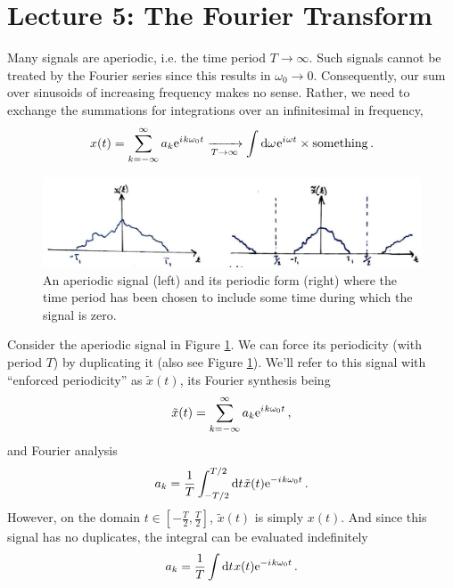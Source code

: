 \section{Lecture 5: The Fourier Transform}

Many signals are aperiodic, i.e. the time period $T \rightarrow\infty$. Such
signals cannot be treated by the Fourier series since this results in
$\omega_0\rightarrow 0$. Consequently, our sum over sinusoids of increasing
frequency makes no sense. Rather, we need to exchange the summations for
integrations over an infinitesimal in frequency,
%
\begin{displaymath}
  x(t) = \sum_{k=-\infty}^\infty a_k\mathrm{e}^{{i\mkern1mu} k\omega_0 t} \xrightarrow[T\rightarrow\infty]{}
  \int\mathrm{d}\omega\mkern1mu \mathrm{e}^{{i\mkern1mu}\omega t} \times \mathrm{something} \,.
\end{displaymath}
%
\begin{figure}[!htb]
  \includegraphics[width=\textwidth]{images/lecture_5_enforce_periodicity.JPG}
  \caption{
    An aperiodic signal (left) and its periodic form (right) where the time period
    has been chosen to include some time during which the signal is zero.
  }
  \label{fig::lecture_5_enforce_periodicity}
\end{figure}
%
Consider the aperiodic signal in Figure \ref{fig::lecture_5_enforce_periodicity}. We can force its periodicity (with
period $T$) by duplicating it (also see Figure \ref{fig::lecture_5_enforce_periodicity}). We'll refer to this
signal with ``enforced periodicity'' as $\tilde{x}(t)$, its Fourier synthesis
being
%
\begin{displaymath}
  \tilde{x}(t) = \sum_{k=-\infty}^\infty a_k\mathrm{e}^{{i\mkern1mu} k\omega_0 t} \,,
\end{displaymath}
%
and Fourier analysis
%
\begin{displaymath}
  a_k = \frac{1}{T}\int_{-T/2}^{T/2} \mathrm{d}t\mkern1mu \tilde{x}(t)\mathrm{e}^{-{i\mkern1mu} k\omega_0 t} \,.
\end{displaymath}
%
However, on the domain $t\in[-\frac{T}{2},\frac{T}{2}]$, $\tilde{x}(t)$ is simply $x(t)$.
And since this signal has no duplicates, the integral can be evaluated indefinitely
%
\begin{displaymath}
  a_k = \frac{1}{T}\int \mathrm{d}t\mkern1mu x(t)\mathrm{e}^{-{i\mkern1mu} k\omega_0 t} \,.
\end{displaymath}
